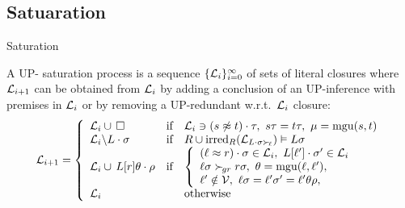 \documentclass[%
handout,
]{beamer}
\begin{document}
\subsection{Satuaration}
\begin{frame}[allowframebreaks]{Saturation}
    \begin{definition}
        A UP-{ saturation process} is
        a sequence \( \{ \mathcal{L}_i \}_{i=0}^\infty \)
        of sets of literal closures where
        \( \mathcal{L}_{i+1} \) can be obtained from
        \( \mathcal{L}_i \)
        by { adding} a conclusion of an UP-inference with premises in $\mathcal{L}_i$
        or by { removing} a UP-redundant w.r.t.~\(\mathcal{L}_i\) closure:
        \begin{gather*}
            \mathcal{L}_{i+1} = \left\{
                \begin{array}{lclc}
                    \mathcal{L}_i \cup\,\square
                    &\text{if}
                    &
                        \mathcal{L}_i\ni(s\not\approx t)\cdot\tau,\ {}
                        s\tau = t\tau,\ {}
                        \mu=\operatorname{mgu}(s,t)
                    \\
                    \mathcal{L}_i \backslash L\cdot\sigma
                    &\text{if}
                    &R \cup \operatorname{irred}_R(\mathcal{L}_{L\cdot\sigma\mathrel\succ_{\!\ell}}) \vDash L\sigma
                    \\
                    \mathcal{L}_i \cup\, L[r]\theta\cdot\rho
                    &\text{if}
                    &\left\{\begin{array}{l}
                        (\ell\approx r)\cdot\sigma\in\mathcal{L}_i,\ {}
                        L[\ell']\cdot\sigma'\in\mathcal{L}_i
                        \\
                        \ell\sigma\mathrel\succ_{\!gr} r\sigma,\ {}
                        \theta=\operatorname{mgu}(\ell,\ell'),
                        \\
                        \ell'\notin\mathcal{V},\ {}
                        \ell\sigma = \ell'\sigma' = \ell'\theta\rho,
                    \end{array}\right.
                    \\
                    \mathcal{L}_i
                    &&\text{otherwise}
                \end{array}
            \right.
        \end{gather*}
    \end{definition}
    \newpage


\end{frame}
\end{document}

